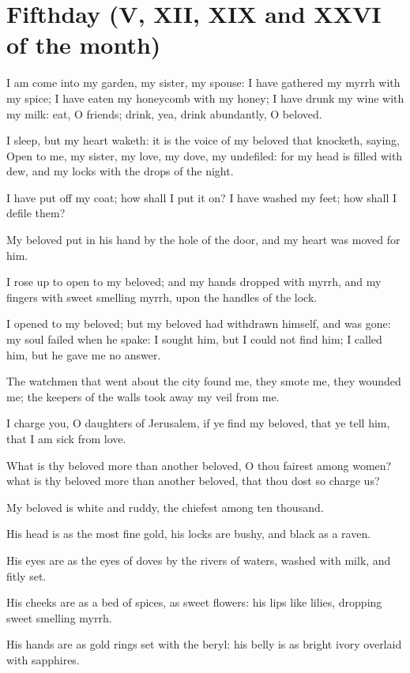 \section{Fifthday (V, XII, XIX and XXVI of the month)}

I am come into my garden, my sister, my spouse: I have gathered my myrrh with my spice; I have eaten my honeycomb with my honey; I have drunk my wine with my milk: eat, O friends; drink, yea, drink abundantly, O beloved.

I sleep, but my heart waketh: it is the voice of my beloved that knocketh, saying, Open to me, my sister, my love, my dove, my undefiled: for my head is filled with dew, and my locks with the drops of the night.

I have put off my coat; how shall I put it on? I have washed my feet; how shall I defile them?

\verseamended My beloved put in his hand by the hole of the door, and my heart was moved for him.

I rose up to open to my beloved; and my hands dropped with myrrh, and my fingers with sweet smelling myrrh, upon the handles of the lock.

I opened to my beloved; but my beloved had withdrawn himself, and was gone: my soul failed when he spake: I sought him, but I could not find him; I called him, but he gave me no answer.

The watchmen that went about the city found me, they smote me, they wounded me; the keepers of the walls took away my veil from me.

\verseamended I charge you, O daughters of Jerusalem, if ye find my beloved, that ye tell him, that I am sick from love.

What is thy beloved more than another beloved, O thou fairest among women? what is thy beloved more than another beloved, that thou dost so charge us?

My beloved is white and ruddy, the chiefest among ten thousand.

His head is as the most fine gold, his locks are bushy, and black as a raven.

His eyes are as the eyes of doves by the rivers of waters, washed with milk, and fitly set.

His cheeks are as a bed of spices, as sweet flowers: his lips like lilies, dropping sweet smelling myrrh.

His hands are as gold rings set with the beryl: his belly is as bright ivory overlaid with sapphires.

